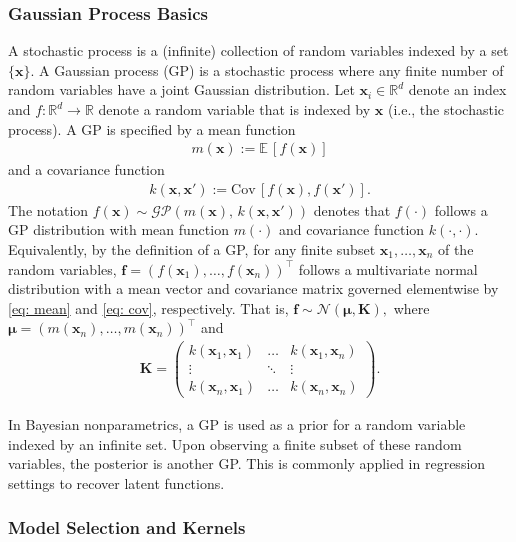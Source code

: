 \documentclass[journal=jacsat,manuscript=article]{achemso}
\newcommand{\reals}{\ensuremath{\mathbb{R}}}
\newcommand{\xvec}{\ensuremath{\mathbf{x}}}
\begin{document}
\subsubsection{Gaussian Process Basics}
A stochastic process is a (infinite) collection of random variables indexed by a set $\{\xvec\}$. A Gaussian process (GP) is a stochastic process where any finite number of random variables have a joint Gaussian distribution. Let $\xvec_i \in \reals^d$ denote an index and $f: \reals^d \rightarrow \reals$ denote a random variable that is indexed by $\xvec$ (i.e., the stochastic process). A GP is specified by a mean function
 \begin{gather}
     m(\xvec) := \mathbb{E}\,[f(\xvec)] \label{eq: mean}
 \end{gather}
 and a covariance function
 \begin{gather}
     k(\xvec, \xvec') := \text{Cov}\,[f(\xvec), f(\mathbf{x'})]. \label{eq: cov}
 \end{gather}
 The notation $f(\xvec)\sim \mathcal{GP}(m(\xvec), \, k(\xvec,\xvec'))$
 denotes that $f(\cdot)$ follows a GP distribution with mean function $m(\cdot)$ and covariance function $k(\cdot,\cdot)$. Equivalently, by the definition of a GP, for any finite subset $\xvec_1, \dots, \xvec_n$ of the random variables, $\mathbf{f}=(f(\xvec_1),  \dots, f(\xvec_n))^\intercal$ follows a multivariate normal distribution with a mean vector and covariance matrix governed elementwise by \eqref{eq: mean} and \eqref{eq: cov}, respectively. That is, $\mathbf{f} \sim \mathcal{N}(\boldsymbol{\mu}, \mathbf{K}),$ where $\boldsymbol{\mu} = (m(\xvec_n), \dots, m(\xvec_n))^\intercal$ and
 \begin{gather} 
     \mathbf{K} = 
     \left(
     \begin{matrix}
         k(\xvec_1,\xvec_1) & \dots & k(\xvec_1,\xvec_n) \\
         \vdots & \ddots & \vdots \\
         k(\xvec_n,\xvec_1) & \dots & k(\xvec_n,\xvec_n)
     \end{matrix}\right).
 \end{gather}

In Bayesian nonparametrics, a GP is used as a prior for a random variable indexed by an infinite set. Upon observing a finite subset of these random variables, the posterior is another GP. This is commonly applied in regression settings to recover latent functions.

\subsubsection{Model Selection and Kernels}
\end{document}
